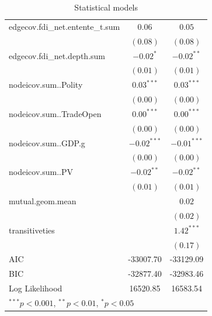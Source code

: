 \documentclass{article}
\begin{document}
\begin{table}
\begin{center}
\begin{tabular}{l c c }
edgecov.fdi\_net.entente\_t.sum  & $0.06$        & $0.05$        \\
                                 & $(0.08)$      & $(0.08)$      \\
edgecov.fdi\_net.depth.sum       & $-0.02^{*}$   & $-0.02^{**}$  \\
                                 & $(0.01)$      & $(0.01)$      \\
nodeicov.sum..Polity             & $0.03^{***}$  & $0.03^{***}$  \\
                                 & $(0.00)$      & $(0.00)$      \\
nodeicov.sum..TradeOpen          & $0.00^{***}$  & $0.00^{***}$  \\
                                 & $(0.00)$      & $(0.00)$      \\
nodeicov.sum..GDP.g              & $-0.02^{***}$ & $-0.01^{***}$ \\
                                 & $(0.00)$      & $(0.00)$      \\
nodeicov.sum..PV                 & $-0.02^{**}$  & $-0.02^{**}$  \\
                                 & $(0.01)$      & $(0.01)$      \\
mutual.geom.mean                 &               & $0.02$        \\
                                 &               & $(0.02)$      \\
transitiveties                   &               & $1.42^{***}$  \\
                                 &               & $(0.17)$      \\
\hline
AIC                              & -33007.70     & -33129.09     \\
BIC                              & -32877.40     & -32983.46     \\
Log Likelihood                   & 16520.85      & 16583.54      \\
\hline
\multicolumn{3}{l}{\scriptsize{$^{***}p<0.001$, $^{**}p<0.01$, $^*p<0.05$}}
\end{tabular}
\caption{Statistical models}
\label{table:coefficients}
\end{center}
\end{table}
\end{document}
